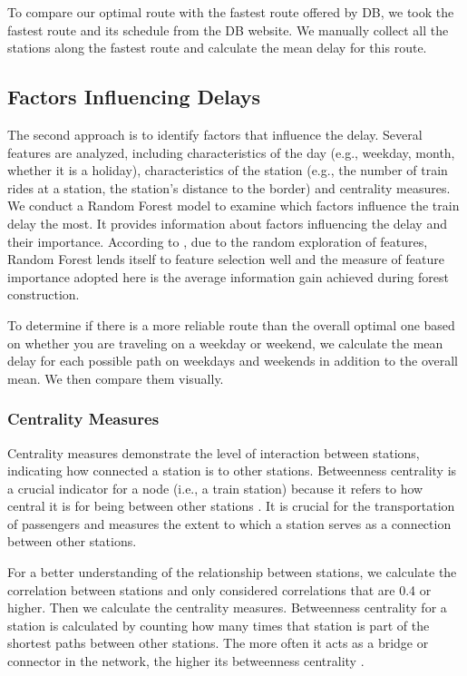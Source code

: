 \documentclass{article}
\theoremstyle{plain}
\theoremstyle{definition}
\theoremstyle{remark}
\begin{document}
	To compare our optimal route with the fastest route offered by DB, we took the fastest route and its schedule from the DB website. We manually collect all the stations along the fastest route and calculate the mean delay for this route.
	
	
	\subsection{Factors Influencing Delays}\label{sec:methods_ext}
	
	The second approach is to identify factors that influence the delay.  Several features are analyzed, including characteristics of the day (e.g., weekday, month, whether it is a holiday), characteristics of the station (e.g., the number of train rides at a station, the station's distance to the border) and centrality measures. We conduct a Random Forest model to examine which factors influence the train delay the most. It provides information about factors influencing the delay and their importance. According to \citet{rogers2006identifying}, due to the random exploration of features, Random Forest lends itself to feature selection well and the measure of feature importance adopted here is the average information gain achieved during forest construction.
	
	To determine if there is a more reliable route than the overall optimal one based on whether you are traveling on a weekday or weekend, we calculate the mean delay for each possible path on weekdays and weekends in addition to the overall mean. We then compare them visually.
	
	\subsubsection{Centrality Measures}
	
	Centrality measures demonstrate the level of interaction between stations, indicating how connected a station is to other stations. Betweenness centrality is a crucial indicator for a node (i.e., a train station) because it refers to how central it is for being between other stations \cite{betweenness}. It is crucial for the transportation of passengers \cite{centrality} and measures the extent to which a station serves as a connection between other stations.
	
	For a better understanding of the relationship between stations, we calculate the correlation between stations and only considered correlations that are 0.4 or higher. Then we calculate the centrality measures. Betweenness centrality for a station is calculated by counting how many times that station is part of the shortest paths between other stations. The more often it acts as a bridge or connector in the network, the higher its betweenness centrality \cite{centrality}.
	
\end{document}
